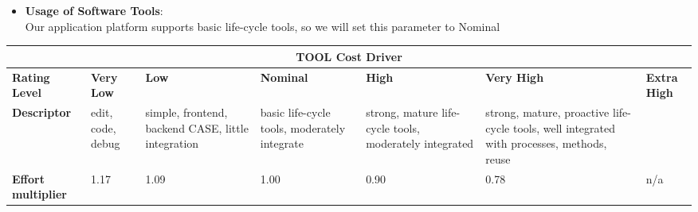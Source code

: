 \begin{itemize}
\item \textbf{Usage of Software Tools}:\\
Our application platform supports basic life-cycle tools, so we will set this parameter to Nominal
\end{itemize}
\hspace*{-3cm}\begin{tabular}{|p{3cm}|p{2cm}|p{2cm}|p{2cm}|p{2cm}|p{2cm}|p{2cm}|}
\hline
\multicolumn{7}{|c|}{\textbf{TOOL Cost Driver}}\\
\hline
\hline
\textbf{Rating Level} & \textbf{Very Low} & \textbf{Low} & \textbf{Nominal} & \textbf{High} & \textbf{Very High} & \textbf{Extra High}\\
\hline
\textbf{Descriptor} & edit, code, debug & simple, frontend, backend CASE, little integration & basic life-cycle tools, moderately integrate  & strong, mature life-cycle tools, moderately integrated & strong, mature, proactive life-cycle tools, well integrated with processes, methods, reuse & \\
\hline
\textbf{Effort multiplier} & 1.17 & 1.09 & 1.00 & 0.90 & 0.78 & n/a\\
\hline 
\end{tabular}
